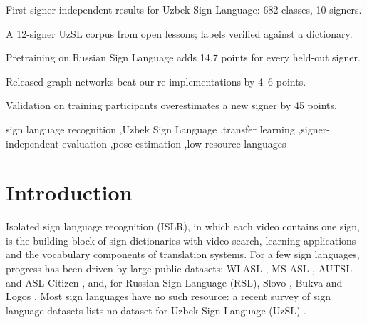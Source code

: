 \documentclass[a4paper,fleqn]{cas-dc}
\begin{document}
\begin{highlights}
\item First signer-independent results for Uzbek Sign Language: 682 classes, 10 signers.
\item A 12-signer UzSL corpus from open lessons; labels verified against a dictionary.
\item Pretraining on Russian Sign Language adds 14.7 points for every held-out signer.
\item Released graph networks beat our re-implementations by 4–6 points.
\item Validation on training participants overestimates a new signer by 45 points.
\end{highlights}
\begin{keywords}
sign language recognition \sep Uzbek Sign Language \sep transfer learning \sep signer-independent evaluation \sep pose estimation \sep low-resource languages
\end{keywords}
\maketitle
\hypertarget{introduction}{%
\section{Introduction}\label{introduction}}

Isolated sign language recognition (ISLR), in which each video contains one sign, is the building block of sign dictionaries with video search, learning applications and the vocabulary components of translation systems. For a few sign languages, progress has been driven by large public datasets: WLASL \cite{2020_li_wlasl}, MS-ASL \cite{2019_joze_msasl}, AUTSL \cite{2020_sincan_autsl} and ASL Citizen \cite{2023_desai_asl_citizen}, and, for Russian Sign Language (RSL), Slovo \cite{2023_kapitanov_slovo}, Bukva \cite{2024_kvanchiani_bukva} and Logos \cite{2025_ovodov_logos}. Most sign languages have no such resource: a recent survey of sign language datasets lists no dataset for Uzbek Sign Language (UzSL) \cite{2026_ni_sign_language_datasets_survey}.
\end{document}
